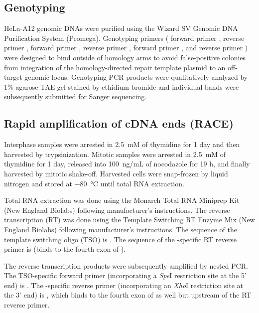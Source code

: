 \subsection{Genotyping}
HeLa-A12 genomic DNAs were purified using the Wizard SV Genomic DNA Purification System (Promega). Genotyping primers ( forward primer ,
 reverse primer ,
 forward primer ,
 reverse primer ,
 forward primer ,
and  reverse primer )
were designed to bind outside of homology arms to avoid false-positive colonies from integration of the homology-directed repair template plasmid to an off-target genomic locus. Genotyping PCR products were qualitatively analyzed by 1\% agarose-TAE gel stained by ethidium bromide and individual bands were subsequently submitted for Sanger sequencing.

\subsection{Rapid amplification of cDNA ends (RACE)}
Interphase samples were arrested in \SI{2.5}{mM} of thymidine for 1 day and then harvested by trypsinization. Mitotic samples were arrested in \SI{2.5}{mM} of thymidine for 1 day, released into \SI{100}{ng/mL} of nocodazole for 19 h, and finally harvested by mitotic shake-off. Harvested cells were snap-frozen by liquid nitrogen and stored at \SI{-80}{\celsius} until total RNA extraction.

Total RNA extraction was done using the Monarch Total RNA Miniprep Kit (New England Biolabs) following manufacturer’s instructions. The reverse transcription (RT) was done using the Template Switching RT Enzyme Mix (New England Biolabs) following manufacturer’s instructions. The sequence of the template switching oligo (TSO) is . The sequence of the -specific RT reverse primer is  (binds to the fourth exon of ).

The reverse transcription products were subsequently amplified by nested PCR. The TSO-specific forward primer (incorporating a \textit{Spe}I restriction site at the 5' end) is . The -specific reverse primer (incorporating an \textit{Xho}I restriction site at the 3' end) is , which binds to the fourth exon of  as well but upstream of the RT reverse primer.

